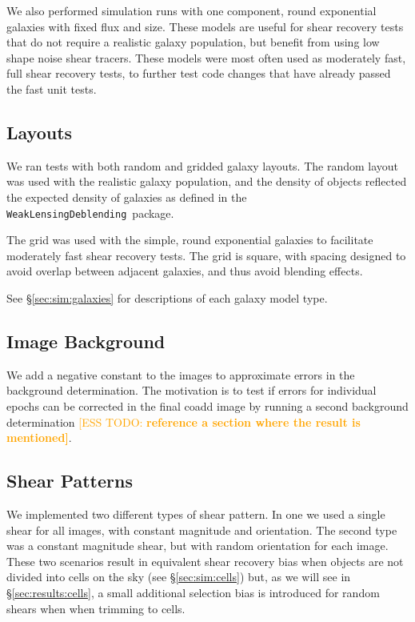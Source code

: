 \documentclass[iop, twocolappendix, appendixfloats, numberedappendix, apj]{hackemulateapj}
\newcommand{\esstodo}[1]{\textcolor{orange}{[ESS TODO: \bf #1]}}
\newcommand{\descwl}{\texttt{WeakLensingDeblending}}
\begin{document}
We also performed simulation runs with one component, round exponential
galaxies with fixed flux and size.  These models are useful for shear recovery
tests that do not require a realistic galaxy population, but benefit from using
low shape noise shear tracers.  These models were most often used as moderately
fast, full shear recovery tests, to further test code changes
that have already passed the fast unit tests.

\subsection{Layouts} \label{sec:sim:layouts}

We ran tests with both random and gridded galaxy layouts.  The random layout
was used with the realistic galaxy population, and the density of objects
reflected the expected density of galaxies as defined in the \descwl\ package.

The grid was used with the simple, round exponential galaxies to facilitate
moderately fast shear recovery tests.  The grid is square, with spacing
designed to avoid overlap between adjacent galaxies, and thus avoid blending
effects.

See \S \ref{sec:sim:galaxies} for descriptions of each galaxy model type.

\subsection{Image Background} \label{sec:sim:bgerr}

We add a negative constant to the images to approximate errors in the
background determination.  The motivation is to test if errors for individual
epochs can be corrected in the final coadd image by running a second background
determination \esstodo{reference a section where the result is mentioned}.

\subsection{Shear Patterns} \label{sec:sim:shears}

We implemented two different types of shear pattern.  In one we used a single
shear for all images, with constant magnitude and orientation.  The second type
was a constant magnitude shear, but with random orientation for each image.
These two scenarios result in equivalent shear recovery bias when objects are
not divided into cells on the sky (see \S \ref{sec:sim:cells}) but, as we will
see in \S \ref{sec:results:cells}, a small additional selection bias is
introduced for random shears when when trimming to cells.
\end{document}
